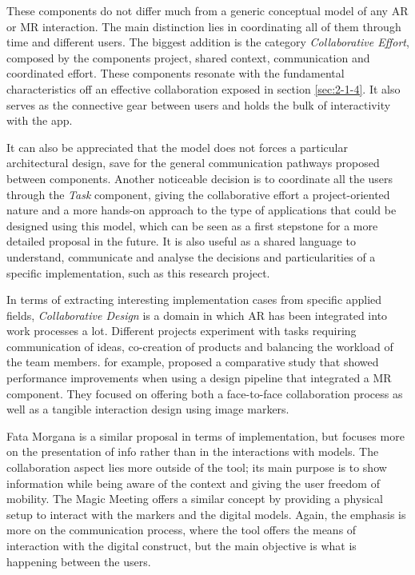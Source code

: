 These components do not differ much from a generic conceptual model of any \ac{AR} or \ac{MR} interaction. The main distinction lies in coordinating all of them through time and different
users. The biggest addition is the category \emph{Collaborative Effort}, composed by the components project, shared context, communication and coordinated effort. These components resonate
with the fundamental characteristics off an effective collaboration exposed in section \ref{sec:2-1-4}. It also serves as the connective gear between users and holds the bulk of
interactivity with the app.

It can also be appreciated that the model does not forces a particular architectural design, save for the general communication pathways proposed between components. Another noticeable
decision is to coordinate all the users through the \emph{Task} component, giving the collaborative effort a project-oriented nature and a more hands-on approach to the type of applications
that could be designed using this model, which can be seen as a first stepstone for a more detailed proposal in the future. It is also useful as a shared language to understand, communicate
and analyse the decisions and particularities of a specific implementation, such as this research project.

In terms of extracting interesting implementation cases from specific applied fields, \emph{Collaborative Design} is a domain in which \ac{AR} has been integrated into work processes a lot.
Different projects experiment with tasks requiring communication of ideas, co-creation of products and balancing the workload of the team members. \textcite{wang_2011} for example, proposed
a comparative study that showed performance improvements when using a design pipeline that integrated a MR component. They focused on offering both a face-to-face collaboration process as
well as a tangible interaction design using image markers.

Fata Morgana \parencite{klinker_2002} is a similar proposal in terms of implementation, but focuses more on the presentation of info rather than in the interactions with models. The
collaboration aspect lies more outside of the tool; its main purpose is to show information while being aware of the context and giving the user freedom of mobility. The Magic Meeting
\parencite{regenbrecht_2002} offers a similar concept by providing a physical setup to interact with the markers and the digital models. Again, the emphasis is more on  the communication
process, where the tool offers the means of interaction with the digital construct, but the main objective is what is happening between the users.

